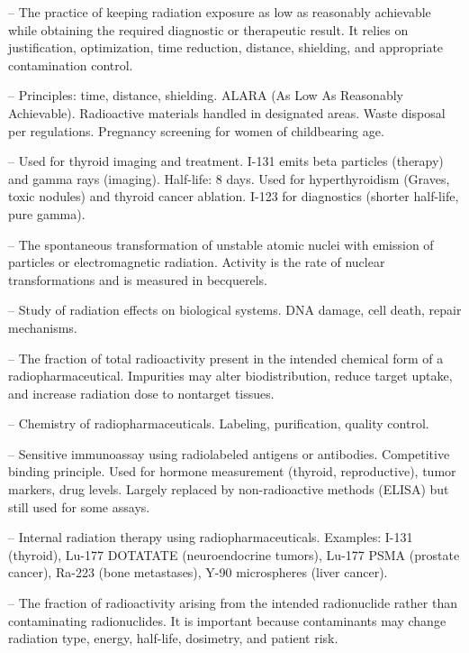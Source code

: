 -- The practice of keeping radiation exposure as low as reasonably achievable while obtaining the required diagnostic or therapeutic result. It relies on justification, optimization, time reduction, distance, shielding, and appropriate contamination control.

-- Principles: time, distance, shielding. ALARA (As Low As Reasonably Achievable). Radioactive materials handled in designated areas. Waste disposal per regulations. Pregnancy screening for women of childbearing age.

-- Used for thyroid imaging and treatment. I-131 emits beta particles (therapy) and gamma rays (imaging). Half-life: 8 days. Used for hyperthyroidism (Graves, toxic nodules) and thyroid cancer ablation. I-123 for diagnostics (shorter half-life, pure gamma).


-- The spontaneous transformation of unstable atomic nuclei with emission of particles or electromagnetic radiation. Activity is the rate of nuclear transformations and is measured in becquerels.

-- Study of radiation effects on biological systems. DNA damage, cell death, repair mechanisms.

-- The fraction of total radioactivity present in the intended chemical form of a radiopharmaceutical. Impurities may alter biodistribution, reduce target uptake, and increase radiation dose to nontarget tissues.

-- Chemistry of radiopharmaceuticals. Labeling, purification, quality control.

-- Sensitive immunoassay using radiolabeled antigens or antibodies. Competitive binding principle. Used for hormone measurement (thyroid, reproductive), tumor markers, drug levels. Largely replaced by non-radioactive methods (ELISA) but still used for some assays.

-- Internal radiation therapy using radiopharmaceuticals. Examples: I-131 (thyroid), Lu-177 DOTATATE (neuroendocrine tumors), Lu-177 PSMA (prostate cancer), Ra-223 (bone metastases), Y-90 microspheres (liver cancer).

-- The fraction of radioactivity arising from the intended radionuclide rather than contaminating radionuclides. It is important because contaminants may change radiation type, energy, half-life, dosimetry, and patient risk.

